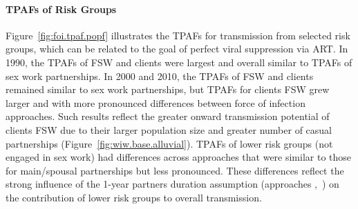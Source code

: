 \paragraph{TPAFs of Risk Groups}
Figure~\ref{fig:foi.tpaf.popf} illustrates the TPAFs for transmission from selected risk groups,
which can be related to the goal of perfect viral suppression via ART.
In 1990, the TPAFs of FSW and clients were largest
and overall similar to TPAFs of sex work partnerships.
In 2000 and 2010, the TPAFs of FSW and clients remained similar to sex work partnerships,
but TPAFs for clients \vs FSW grew larger
and with more pronounced differences between force of infection approaches.
Such results reflect the greater onward transmission potential of clients \vs FSW
due to their larger population size and greater number of casual partnerships
(\eg Figure~\ref{fig:wiw.base.alluvial}).
TPAFs of lower risk groups (not engaged in sex work) had differences across approaches that were
similar to those for main/spousal partnerships but less pronounced.
These differences reflect the strong influence of the 1-year partners duration assumption
(\ie approaches \iry,~\ipy) on the contribution of lower risk groups to overall transmission.
